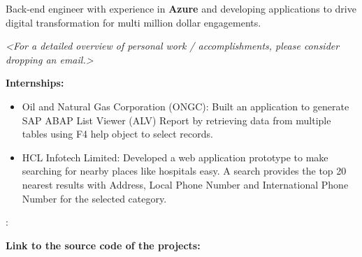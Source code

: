 \documentclass[9.5pt,a4paper]{altacv}
\begin{document}

\begin{fullwidth}
\makecvheader
\end{fullwidth}



Back-end engineer with experience in \textbf{\color{emphasis}Azure} and developing applications to drive digital transformation for multi million dollar engagements.

\smallskip

\textit{<For a detailed overview of personal work / accomplishments, please consider dropping an email.>}

\divider

\textbf{Internships:}

\medskip

\begin{itemize}
    \item {\color{emphasis}Oil and Natural Gas Corporation (ONGC):} Built an application to generate SAP ABAP List Viewer (ALV) Report by retrieving data from multiple tables using F4 help object to select records.
    \medskip
    \item {\color{emphasis}HCL Infotech Limited:} Developed a web application prototype to make searching for nearby places like hospitals easy. A search provides the top 20 nearest results with Address, Local Phone Number and International Phone Number for the selected category.
\end{itemize}

\vspace{0.8em}

: \href{https://www.eurekaselect.com/166119/article}{}

\vspace{0.8em}

\smallskip

\textbf{Link to the source code of the projects:} \href{https://github.com/Diksha-Rathi}{}
\end{document}
